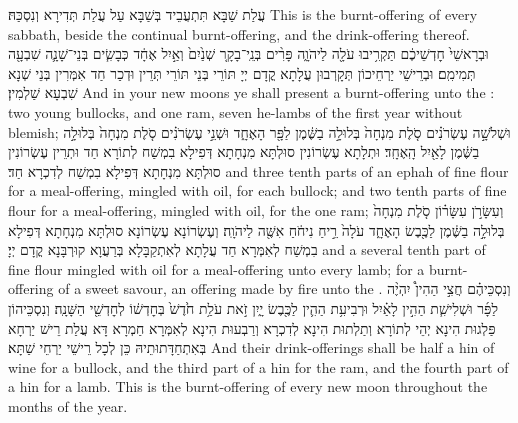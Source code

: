 {עֲלַת שַׁבָּא תִּתְעֲבֵיד בְּשַׁבָּא עַל עֲלַת תְּדִירָא וְנִסְכַּהּ׃}
{This is the burnt-offering of every sabbath, beside the continual burnt-offering, and the drink-offering thereof.}{}
{וּבְרָאשֵׁי֙ חׇדְשֵׁיכֶ֔ם תַּקְרִ֥יבוּ עֹלָ֖ה לַיהֹוָ֑ה פָּרִ֨ים בְּנֵֽי־בָקָ֤ר שְׁנַ֙יִם֙ וְאַ֣יִל אֶחָ֔ד כְּבָשִׂ֧ים בְּנֵי־שָׁנָ֛ה שִׁבְעָ֖ה תְּמִימִֽם׃}
{וּבְרֵישֵׁי יַרְחֵיכוֹן תְּקָרְבוּן עֲלָתָא קֳדָם יְיָ תּוֹרֵי בְּנֵי תּוֹרֵי תְּרֵין וּדְכַר חַד אִמְּרִין בְּנֵי שְׁנָא שִׁבְעָא שַׁלְמִין׃}
{And in your new moons ye shall present a burnt-offering unto the \lord: two young bullocks, and one ram, seven he-lambs of the first year without blemish;}{}
{וּשְׁלֹשָׁ֣ה עֶשְׂרֹנִ֗ים סֹ֤לֶת מִנְחָה֙ בְּלוּלָ֣ה בַשֶּׁ֔מֶן לַפָּ֖ר הָאֶחָ֑ד וּשְׁנֵ֣י עֶשְׂרֹנִ֗ים סֹ֤לֶת מִנְחָה֙ בְּלוּלָ֣ה בַשֶּׁ֔מֶן לָאַ֖יִל הָֽאֶחָֽד׃
}
{וּתְלָתָא עֶשְׂרוֹנִין סוּלְתָּא מִנְחָתָא דְּפִילָא בִמְשַׁח לְתוֹרָא חַד וּתְרֵין עֶשְׂרוֹנִין סוּלְתָּא מִנְחָתָא דְּפִילָא בִמְשַׁח לְדִכְרָא חַד׃}
{and three tenth parts of an ephah of fine flour for a meal-offering, mingled with oil, for each bullock; and two tenth parts of fine flour for a meal-offering, mingled with oil, for the one ram;}{}
{וְעִשָּׂרֹ֣ן עִשָּׂר֗וֹן סֹ֤לֶת מִנְחָה֙ בְּלוּלָ֣ה בַשֶּׁ֔מֶן לַכֶּ֖בֶשׂ הָאֶחָ֑ד עֹלָה֙ רֵ֣יחַ נִיחֹ֔חַ אִשֶּׁ֖ה לַיהֹוָֽה׃}
{וְעֶשְׂרוֹנָא עֶשְׂרוֹנָא סוּלְתָּא מִנְחָתָא דְּפִילָא בִמְשַׁח לְאִמְּרָא חַד עֲלָתָא לְאִתְקַבָּלָא בְּרַעֲוָא קוּרְבָּנָא קֳדָם יְיָ׃}
{and a several tenth part of fine flour mingled with oil for a meal-offering unto every lamb; for a burnt-offering of a sweet savour, an offering made by fire unto the \lord.}{}
{וְנִסְכֵּיהֶ֗ם חֲצִ֣י הַהִין֩ יִהְיֶ֨ה לַפָּ֜ר וּשְׁלִישִׁ֧ת הַהִ֣ין לָאַ֗יִל וּרְבִיעִ֥ת הַהִ֛ין לַכֶּ֖בֶשׂ יָ֑יִן זֹ֣את עֹלַ֥ת חֹ֙דֶשׁ֙ בְּחׇדְשׁ֔וֹ לְחׇדְשֵׁ֖י הַשָּׁנָֽה׃
}
{וְנִסְכֵּיהוֹן פַּלְגוּת הִינָא יְהֵי לְתוֹרָא וְתַלְתוּת הִינָא לְדִכְרָא וְרַבְעוּת הִינָא לְאִמְּרָא חַמְרָא דָּא עֲלַת רֵישׁ יַרְחָא בְּאִתְחַדָּתוּתֵיהּ כֵּן לְכָל רֵישֵׁי יַרְחֵי שַׁתָּא׃}
{And their drink-offerings shall be half a hin of wine for a bullock, and the third part of a hin for the ram, and the fourth part of a hin for a lamb. This is the burnt-offering of every new moon throughout the months of the year.}{}
